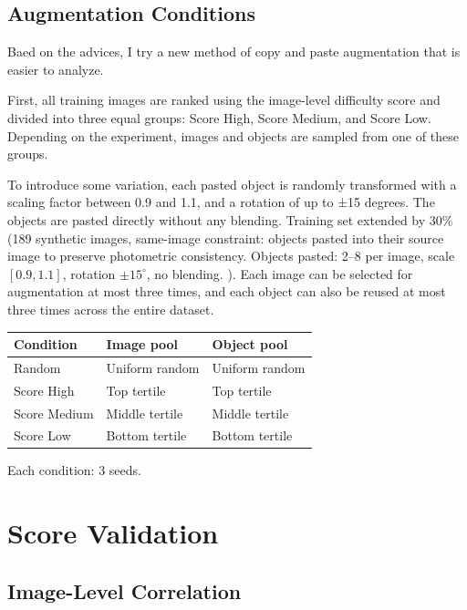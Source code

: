 \documentclass[10pt, a4paper]{article}
\begin{document}
\subsection{Augmentation Conditions}
Baed on the advices, I try a new method of copy and paste augmentation that 
is easier to analyze. 

First, all training images are ranked using the image-level 
difficulty score and divided into three equal 
groups: Score High, Score Medium, and Score Low. Depending on the 
experiment, images and objects are sampled from one of these groups.

To introduce some variation, each pasted object is randomly transformed 
with a scaling factor between 0.9 and 1.1, and a rotation of up to ±15 degrees.
The objects are pasted directly without any blending.
Training set extended by 30\% (189 synthetic images, same-image
constraint: objects pasted into their source image to preserve
photometric consistency.
Objects pasted: 2--8 per image, scale $[0.9,1.1]$, rotation $\pm15^\circ$,
no blending. \cite{kisantal2019}).
Each image can be selected for augmentation at most three times, 
and each object can also be reused at most three times across the entire dataset.

\begin{center}
\small
\begin{tabular}{lll}
\toprule
\textbf{Condition} & \textbf{Image pool} & \textbf{Object pool} \\
\midrule
Random        & Uniform random & Uniform random \\
Score High    & Top tertile    & Top tertile \\
Score Medium  & Middle tertile & Middle tertile \\
Score Low     & Bottom tertile & Bottom tertile \\
\bottomrule
\end{tabular}
\end{center}

Each condition: 3 seeds.

\section{Score Validation}

\subsection{Image-Level Correlation}
\end{document}
